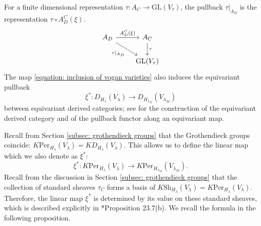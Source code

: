 \documentclass[11pt,letterpaper]{amsart}
\newcommand{\GL}{\mathrm{GL}}
\newcommand{\Per}{\mathrm{Per}}
\newcommand{\stsh}[2]{{#1}_{#2}}
\renewcommand{\1}{\mathbbm{1}}
\numberwithin{equation}{section}
\begin{document}
{For a finite dimensional representation $\tau: A_C \to \GL(V_\tau)$, the pullback $\tau\vert_{A_D}$ is the representation $\tau \circ A_D^C(\xi)$.
\begin{equation}\label{equation: pullback of a rep of fund group}
\begin{tikzcd}
	{A_D} & {A_C} \\
	& {\GL(V_\tau)}
	\arrow["{A_D^C(\xi)}", from=1-1, to=1-2]
	\arrow["{\tau\vert_{A_D}}"', from=1-1, to=2-2]
	\arrow["\tau", from=1-2, to=2-2]
\end{tikzcd}
\end{equation}
The map \eqref{equation: inclusion of vogan varieties} also induces the equivariant pullback 
\[\xi^*:D_{H_\lambda}(V_\lambda) \to D_{H_{\lambda_M}}(V_{\lambda_M}) \]
between equivariant derived categories; see \cite{BL94} for the construction of the equivariant derived category and of the pullback functor along an equivariant map. 

Recall from Section \ref{subsec: grothendieck groups} that the Grothendieck groups coincide: $K\Per_{H_\lambda}(V_\lambda)=KD_{H_\lambda}(V_\lambda)$. This allows us to define the linear map which we also denote as $\xi^*$:
\begin{equation}\label{equation: restriction linear map perverse sheaves}
    \xi^*: K\Per_{H_\lambda}(V_\lambda) \xrightarrow{} K\Per_{H_{\lambda_M}}(V_{\lambda_M}).
\end{equation} 
Recall from the discussion in Section \ref{subsec: grothendieck groups} that the collection of standard sheaves $\stsh{\tau}{C}$ forms a basis of $K\textrm{Sh}_{H_{\lambda}}(V_{\lambda})= K \Per_{H_{\lambda}}(V_{\lambda})$. Therefore, the linear map $\xi^{\ast}$ is determined by its value on these standard sheaves, which is described explicitly in \cite{ABV92}*{Proposition 23.7(b)}. We recall the formula in the following proposition.

}
\end{document}
